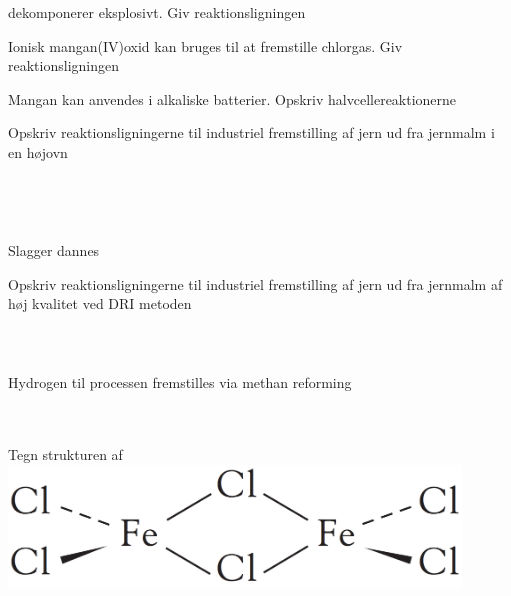 \begin{flashcard}[Reaktion]{ dekomponerer eksplosivt. Giv reaktionsligningen}
\end{flashcard}

\begin{flashcard}[Reaktion]{Ionisk mangan(IV)oxid kan bruges til at fremstille chlorgas. Giv reaktionsligningen}
\end{flashcard}

\begin{flashcard}[Anvendelse]{Mangan kan anvendes i alkaliske batterier. Opskriv halvcellereaktionerne}
\\
\end{flashcard}

\begin{flashcard}[Fremstilling]{Opskriv reaktionsligningerne til industriel fremstilling af jern ud fra jernmalm i en højovn}
\\
\\
\\
\\
\\
Slagger dannes
\\
\end{flashcard}

\begin{flashcard}[Fremstilling]{Opskriv reaktionsligningerne til industriel fremstilling af jern ud fra jernmalm af høj kvalitet ved DRI metoden}
\\
\\
\\
\\
Hydrogen til processen fremstilles via methan reforming\\
\\
\\
\end{flashcard}

\begin{flashcard}[Struktur]{Tegn strukturen af }
\includegraphics[width=0.9\textwidth]{figures/k20s553fe2cl6.png}
\end{flashcard}

